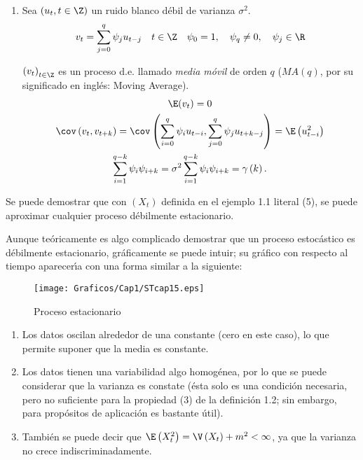 \begin{ejemplo}
\begin{enumerate}
\item Sea $\left(u_{t} ,t\in \Z \right)$ un ruido blanco d\'{e}bil de varianza $\sigma^{2}$.
\[
	v_{t} =\sum_{j=0}^q {\psi_{j} u_{t-j} } \quad t\in \Z \quad \psi_{0} =1, \quad \psi_{q} \neq 0, \quad \psi_{j} \in \R
\]

$\left( {v_{t} } \right)_{t\in \Z} $ es un proceso d.e. llamado \emph{media m\'{o}vil} de orden $q$ ($MA(q)$, por su significado en ingl\'{e}s: Moving Average).
\begin{gather*}
	\E(v_{t}) =0\\
	\cov\left( {v_{t} ,v_{t+k} } \right)=\cov\left(\sum_{i=0}^q \psi_{i} u_{t-i},\sum_{j=0}^q \psi_{j} u_{t+k-j} \right)=\E\left({u_{t-i}^{2} } \right)\\
	\sum_{i=1}^{q-k} \psi_{i} \psi_{i+k}  =\sigma^{2}\sum_{i=1}^{q-k} \psi_{i} \psi_{i+k} =\gamma \left( k \right).
\end{gather*}

\end{enumerate}
\end{ejemplo}

\begin{observacion}
Se puede demostrar que con $\left( X_{t} \right)$ definida en el ejemplo 1.1 literal (5), se puede aproximar cualquier proceso d\'{e}bilmente estacionario.
\end{observacion}

Aunque te\'{o}ricamente es algo complicado demostrar que un proceso estoc\'{a}stico es d\'{e}bilmente estacionario, gr\'{a}ficamente se puede intuir; su gr\'{a}fico con respecto al tiempo aparecer\'{\i}a con una forma similar a la siguiente:

\begin{figure}[H]
\centering
\texttt{[image: Graficos/Cap1/STcap15.eps]}
\caption{Proceso estacionario}\label{fig5}
\end{figure}

\begin{enumerate}
\item Los datos oscilan alrededor de una constante (cero en este caso), lo que permite suponer que la media es constante.
\item Los datos tienen una variabilidad algo homog\'{e}nea, por lo que se puede considerar que la varianza es constate (\'{e}sta solo es una condici\'{o}n necesaria, pero no suficiente para la propiedad (3) de la definici\'{o}n 1.2; sin embargo, para prop\'{o}sitos de aplicaci\'{o}n es bastante \'{u}til).
\item Tambi\'{e}n se puede decir que $\E\left( X_{t}^{2} \right)=\V\left( X_{t} \right)+m^{2}<\infty $, ya que la varianza no crece indiscriminadamente.
\end{enumerate}

